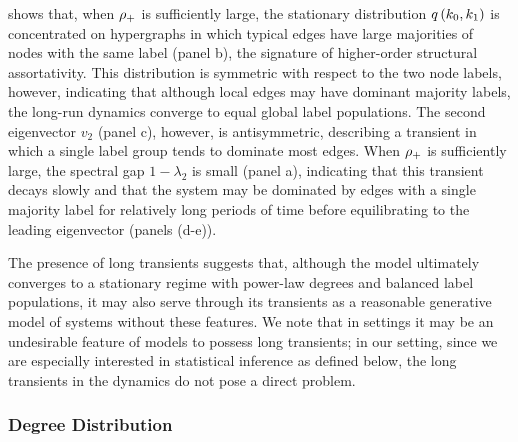 \documentclass[aps,pre,reprint,superscriptaddress,nofootinbib]{revtex4-2}
\begin{document}
     shows that, when $\rho{}_+$ is sufficiently large, the stationary distribution $q \left( k_0, k_1 \right)$ is concentrated on hypergraphs in which typical edges have large majorities of nodes with the same label (panel b), the signature of higher-order structural assortativity.
    This distribution is symmetric with respect to the two node labels, however, indicating that although local edges may have dominant majority labels, the long-run dynamics converge to equal global label populations.  
    The second eigenvector $v_2$ (panel c), however,  is antisymmetric, describing a transient in which a single label group tends to dominate most edges. 
    When $\rho{}_+$ is sufficiently large, the spectral gap $1 - \lambda_2$ is small (panel a), indicating that this transient decays slowly and that the system may be dominated by edges with a single majority label for relatively long periods of time before equilibrating to the leading eigenvector (panels (d-e)).

    The presence of long transients suggests that, although the \model{} model ultimately converges to a stationary regime with power-law degrees and balanced label populations, it may also serve through its transients as a reasonable generative model of systems without these features. 
    We note that in settings it may be an undesirable feature of models to possess long transients; in our setting, since we are especially interested in statistical inference as defined below, the long transients in the dynamics do not pose a direct problem.  

\subsubsection{Degree Distribution} \label{sec:degree-distribution}
\end{document}
